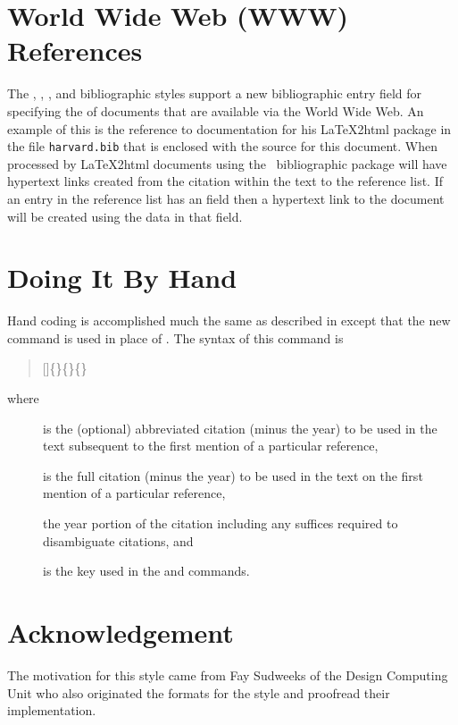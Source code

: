 \section{World Wide Web (WWW) References}

The , , ,  and
 bibliographic styles support a new bibliographic entry
field  for specifying the  of documents that are
available via the World Wide Web.
An example of this is the reference to 
documentation for his \LaTeX 2{\sc html} package in the file
\verb+harvard.bib+ that is enclosed with the source for this document.
When processed by \LaTeX 2{\sc html} documents using the \harvard\ bibliographic
package will have hypertext links created from the citation within the text
to the reference list.
If an entry in the reference list has an  field then a
hypertext link to the document will be created using the data in that field.

\section{Doing It By Hand}
Hand coding is accomplished much the same as described in 
except that the new command  is used in place
of .
The syntax of this command is
\begin{quote}
 []\{\}\{\}\{\}
\end{quote}
where
\begin{description}
\item[] is the (optional) abbreviated citation
(minus the year) to be used in the text
subsequent to the first mention of a particular reference,
\item[] is the full citation (minus the year)
to be used in the text
on the first mention of a particular reference,
\item[] the year portion of the citation including any
suffices required to disambiguate citations, and
\item[] is the key used in the  and
 commands.
\end{description}

\section{Acknowledgement}
The motivation for this style came from Fay Sudweeks of the Design Computing
Unit who also originated the formats for the  style and proofread
their implementation.

